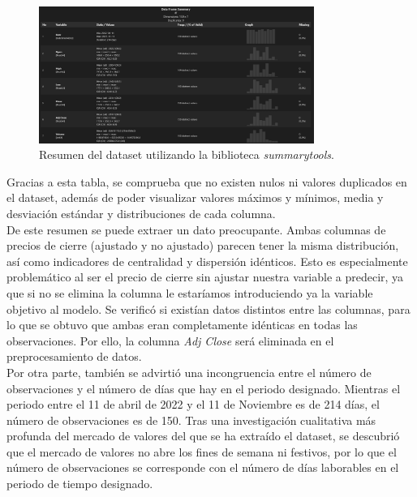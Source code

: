 \documentclass[a4paper, 12pt]{report}
\begin{document}
                        \begin{figure}[H]
                                \centering
                                \includegraphics[width=0.8\textwidth]{resources/images/stock_stats.png}
                                \caption{Resumen del dataset utilizando la biblioteca \textit{summarytools}.}
                                \label{fig:summarytools}
                        \end{figure}

                        Gracias a esta tabla, se comprueba que no existen nulos ni valores duplicados en el dataset, además de poder visualizar
                        valores máximos y mínimos, media y desviación estándar y distribuciones de cada columna.\\

                        De este resumen se puede extraer un dato preocupante. Ambas columnas de precios de cierre (ajustado y no ajustado) parecen tener la misma
                        distribución, así como indicadores de centralidad y dispersión idénticos. Esto es especialmente problemático al ser el precio de cierre 
                        sin ajustar nuestra variable a predecir, ya que si no se elimina la columna le estaríamos introduciendo ya la variable objetivo al modelo. Se verificó si existían datos
                        distintos entre las columnas, para lo que se obtuvo que ambas eran completamente idénticas en todas las observaciones. Por ello, la columna \textit{Adj Close} será
                        eliminada en el preprocesamiento de datos. \\

                        Por otra parte, también se advirtió una incongruencia entre el número de observaciones y el número de días que hay en el periodo designado.
                        Mientras el periodo entre el 11 de abril de 2022 y el 11 de Noviembre es de 214 días, el número de observaciones es de 150. Tras una investigación cualitativa más profunda del 
                        mercado de valores del que se ha extraído el dataset, se descubrió que el mercado de valores no abre los fines de semana ni festivos, por lo que el número de observaciones se corresponde con 
                        el número de días laborables en el periodo de tiempo designado.\\
\end{document}
